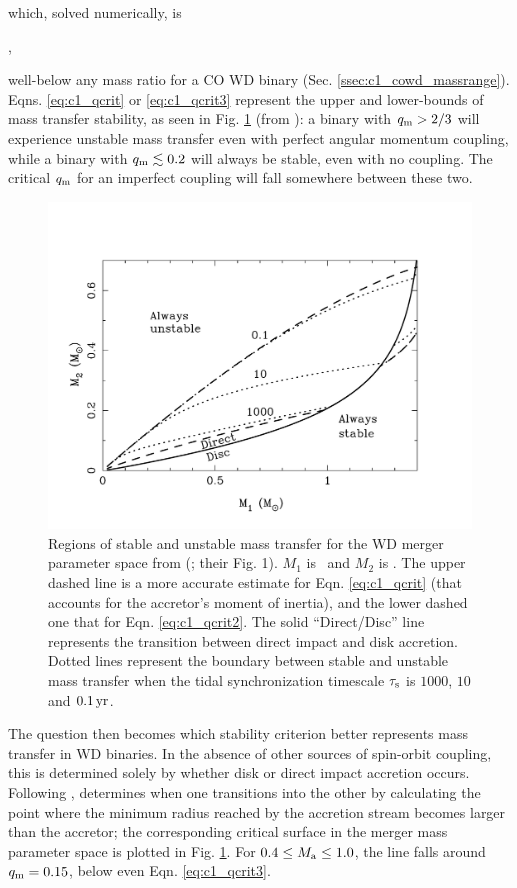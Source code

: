 \noindent which, solved numerically, is

\eqbegin
\qm{},
\label{eq:c1_qcrit3}
\eqend

\noindent well-below any mass ratio for a CO WD binary (Sec. \ref{ssec:c1_cowd_massrange}).  Eqns. \ref{eq:c1_qcrit} or \ref{eq:c1_qcrit3} represent the upper and lower-bounds of mass transfer stability, as seen in Fig. \ref{fig:c1_stability} (from \citealt{marsns04}): a binary with $\qm > 2/3$ will experience unstable mass transfer even with perfect angular momentum coupling, while a binary with $\qm \lesssim 0.2$ will always be stable, even with no coupling.  The critical $\qm$ for an imperfect coupling will fall somewhere between these two.

\begin{figure}
\centering
\includegraphics[angle=0,width=0.65\columnwidth]{introduction/figures/marsns04_stab.pdf}
\caption{Regions of stable and unstable mass transfer for the WD merger parameter space from \citeauthor{marsns04} (\citeyear{marsns04}; their Fig. 1).  $M_1$ is \Ma\, and $M_2$ is \Md.  The upper dashed line is a more accurate estimate for Eqn. \ref{eq:c1_qcrit} {\charles (that accounts for the accretor's moment of inertia)}, and the lower dashed one that for Eqn. \ref{eq:c1_qcrit2}.  The solid ``Direct/Disc'' line represents the transition between direct impact and disk accretion.  Dotted lines represent the boundary between stable and unstable mass transfer when the tidal synchronization timescale $\tau_\mathrm{s}$ is $1000$, $10$ and $0.1\,\mathrm{yr}$.}
\label{fig:c1_stability}
\end{figure}

The question then becomes which stability criterion better represents mass transfer in WD binaries.  In the absence of other sources of spin-orbit coupling, this is determined solely by whether disk or direct impact accretion occurs.  Following \cite{lubos75}, \cite{nele+01} determines when one transitions into the other by calculating the point where the minimum radius reached by the accretion stream becomes larger than the accretor; the corresponding critical surface in the merger mass parameter space is plotted in Fig. \ref{fig:c1_stability}.  For $0.4 \leq \Ma \leq 1.0$, the line falls around $\qm = 0.15$, below even Eqn. \ref{eq:c1_qcrit3}.

